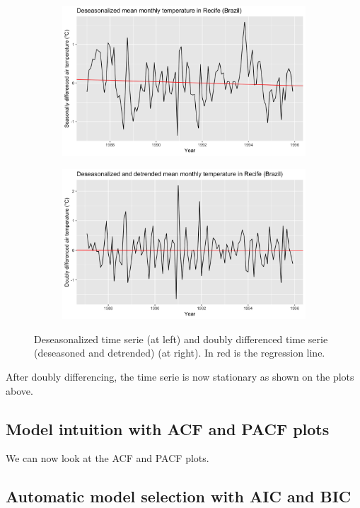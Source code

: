 \begin{figure}[H]
	\centering
	\begin{subfigure}{0.49\textwidth}
		\centering
		\includegraphics[width=\textwidth]{figures/box_jenkins/deseasonalized_time_serie.png}
		\label{fig:deseasonalized-time-serie}
	\end{subfigure}
	\begin{subfigure}{0.49\textwidth}
		\centering
		\includegraphics[width=\textwidth]{figures/box_jenkins/doubly_differenced_time_serie.png}
		\label{fig:doubly-differenced-time-serie}
	\end{subfigure}
	\caption{Deseasonalized time serie (at left) and doubly differenced time serie (deseasoned and detrended) (at right). In red is the regression line.}
\end{figure}

After doubly differencing, the time serie is now stationary as shown on the plots above.

\subsection{Model intuition with ACF and PACF plots}

We can now look at the ACF and PACF plots.

\subsection{Automatic model selection with AIC and BIC}